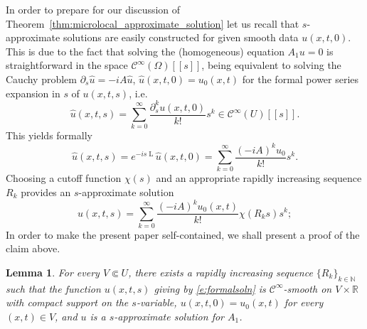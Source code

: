 \documentclass[11pt]{amsart}
\newcommand{\fpstwo}[2]{#1[[#2]]}
\newcommand{\cinfty}{\mathcal{C}^\infty}
\DeclareMathOperator{\ourL}{L}
\theoremstyle{definition}
\theoremstyle{remark}
\theoremstyle{plain}
\newtheorem{lem}[defn]{Lemma}
\begin{document}
In order to prepare for our discussion of Theorem~\ref{thm:microlocal_approximate_solution} let us recall that  $s$-approximate solutions are easily constructed for given smooth data 
 $u(x,t,0)$. This is due to the fact
that solving the (homogeneous) equation $A_1 u = 0$ is straightforward in the space 
$\fpstwo{\cinfty(\Omega)}{s}$, being equivalent to solving the Cauchy problem  $\partial_s \hat u = -i A \hat u$, $\hat u (x,t,0) = u_0 (x,t)$ for
the formal power series expansion in $s$ of $u(x,t,s)$, i.e. 
\[ \hat u(x,t,s) = \sum_{k=0}^\infty \frac{\partial_s^k u (x,t,0)}{k!} s^k \in \fpstwo{\cinfty(U)}{s}. \]
This yields formally  
\[  \hat u (x,t,s) = e^{-i s \ourL} \hat u (x,t,0) = \sum_{k=0}^\infty \frac{ (-i A)^{k}  u_0}{k!} s^k.  \]
Choosing a cutoff function $\chi(s)$ and an appropriate rapidly increasing sequence $R_k$
provides an $s$-approximate solution   
\begin{equation}
\label{e:formalsoln} u(x,t,s) = \sum_{k=0}^\infty  \frac{ (-i A)^{k} u_0(x,t)}{k!} \chi \left( R_ks \right) s^k;
\end{equation}
%
%
In order to make the present paper self-contained, we shall present a proof of the claim above.
%
\begin{lem}
For every $V \Subset U$, there exists a rapidly increasing sequence $\{R_k\}_{k \in \mathbb{N}}$ such that the function $u(x,t,s)$ giving by \eqref{e:formalsoln} is $\mathcal{C}^\infty$-smooth on $V \times \mathbb{R}$ with compact support on the $s$-variable, $u(x,t,0) = u_0(x,t)$ for every $(x,t) \in V$, and $u$ is a $s$-approximate solution for $A_1$. 
\end{lem}
%
\end{document}
